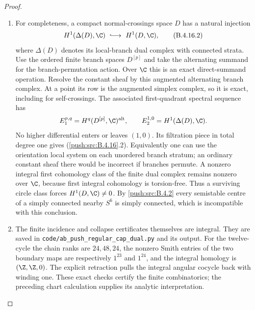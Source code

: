 \begin{proof}
\begin{enumerate}[label=\arabic*.,leftmargin=*]
\item For completeness, a compact normal-crossings space $D$
has a natural injection
\[
 H^1(\Delta(D),\C)\ \lhook\joinrel\longrightarrow\
 H^1(D,\C),
 \tag{B.4.16.2}
\]
where $\Delta(D)$ denotes its local-branch dual
complex with connected strata. Use the ordered finite
branch spaces $D^{[p]}$ and take the alternating
summand for the branch-permutation action. Over $\C$
this is an exact direct-summand operation. Resolve the
constant sheaf by this augmented alternating branch
complex. At a point its row is the augmented simplex
complex, so it is exact, including for self-crossings.
The associated first-quadrant spectral sequence has
\[
 E_1^{p,q}=H^q(D^{[p]},\C)^{\mathrm{alt}},
 \qquad
 E_2^{1,0}=H^1(\Delta(D),\C).
\]
No higher differential enters or leaves $(1,0)$.
Its filtration piece in total degree one gives
(\ref{push:src:B.4.16}.2). Equivalently one can use the orientation
local system on each unordered branch stratum; an
ordinary constant sheaf there would be incorrect if
branches permute. A nonzero integral first cohomology
class of the finite dual complex remains nonzero over
$\C$, because first integral cohomology is torsion-free.
Thus a surviving circle class forces $H^1(D,\C)\ne0$.
By \ref{push:src:B.4.2} every semistable centre of
a simply connected nearby $S^6$ is simply connected,
which is incompatible with this conclusion.

\item The finite incidence and collapse certificates themselves
are integral. They are
saved in \texttt{code/ab\_push\_regular\_cap\_dual.py}
and its output. For the twelve-cycle the chain ranks
are $24,48,24$, the nonzero Smith entries of the two
boundary maps are respectively $1^{23}$ and $1^{24}$,
and the integral homology is $(\Z,\Z,0)$.
The explicit retraction pulls the integral angular
cocycle back with winding one. These exact checks
certify the finite combinatorics; the preceding chart
calculation supplies its analytic interpretation.
\end{enumerate}
\end{proof}

